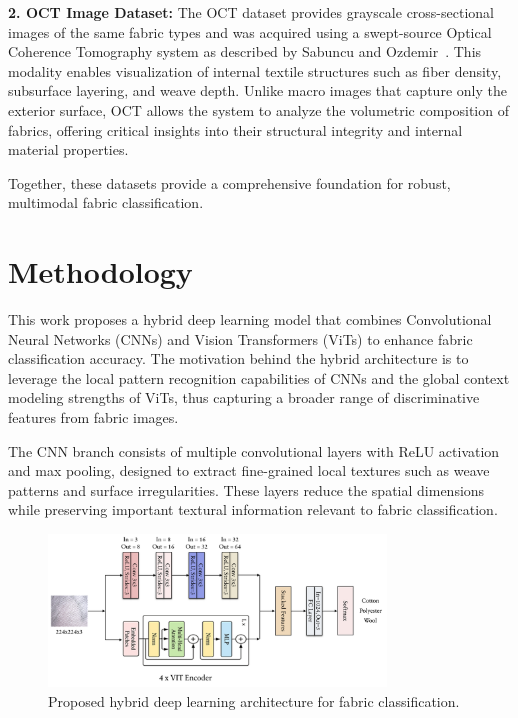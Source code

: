 \textbf{2. OCT Image Dataset:}  
The OCT dataset provides grayscale cross-sectional images of the same fabric types and was acquired using a swept-source Optical Coherence Tomography system as described by Sabuncu and Ozdemir~\cite{sabuncu2020oct}. This modality enables visualization of internal textile structures such as fiber density, subsurface layering, and weave depth. Unlike macro images that capture only the exterior surface, OCT allows the system to analyze the volumetric composition of fabrics, offering critical insights into their structural integrity and internal material properties.

Together, these datasets provide a comprehensive foundation for robust, multimodal fabric classification.

\section*{Methodology}

This work proposes a hybrid deep learning model that combines Convolutional Neural Networks (CNNs) and Vision Transformers (ViTs) to enhance fabric classification accuracy. The motivation behind the hybrid architecture is to leverage the local pattern recognition capabilities of CNNs and the global context modeling strengths of ViTs, thus capturing a broader range of discriminative features from fabric images.

The CNN branch consists of multiple convolutional layers with ReLU activation and max pooling, designed to extract fine-grained local textures such as weave patterns and surface irregularities. These layers reduce the spatial dimensions while preserving important textural information relevant to fabric classification.

\begin{figure}[h]
    \centering
    \includegraphics[width=0.8\textwidth]{images/ModelDiagram.png}
    \caption{Proposed hybrid deep learning architecture for fabric classification.}
    \label{fig:model_diagram}
\end{figure}

